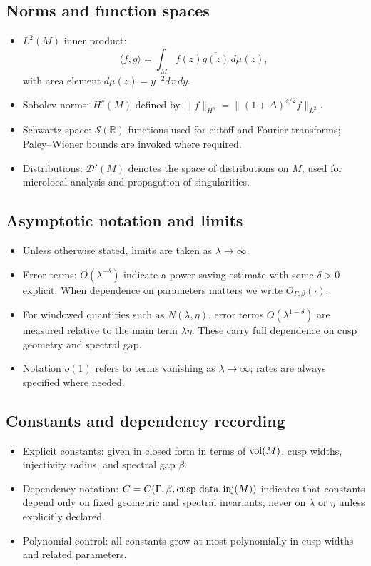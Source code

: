 \subsection*{Norms and function spaces}
\begin{itemize}
  \item $L^2(M)$ inner product: 
    \[
      \langle f,g\rangle=\int_M f(z)\overline{g(z)}\,d\mu(z),
    \]
    with area element $d\mu(z)=y^{-2}dx\,dy$.
  \item Sobolev norms: $H^s(M)$ defined by 
    $\|f\|_{H^s}=\|(1+\Delta)^{s/2}f\|_{L^2}$.
  \item Schwartz space: $\mathcal{S}(\mathbb{R})$ functions used for cutoff and Fourier transforms; 
    Paley–Wiener bounds are invoked where required.
  \item Distributions: $\mathcal{D}'(M)$ denotes the space of distributions on $M$, 
    used for microlocal analysis and propagation of singularities.
\end{itemize}

\subsection*{Asymptotic notation and limits}
\begin{itemize}
  \item Unless otherwise stated, limits are taken as $\lambda\to\infty$.
  \item Error terms: $O(\lambda^{-\delta})$ indicate a power-saving estimate 
    with some $\delta>0$ explicit. 
    When dependence on parameters matters we write $O_{\Gamma,\beta}(\cdot)$.
  \item For windowed quantities such as $N(\lambda,\eta)$, 
    error terms $O(\lambda^{1-\delta})$ are measured relative to the main term $\lambda \eta$. 
    These carry full dependence on cusp geometry and spectral gap.
  \item Notation $o(1)$ refers to terms vanishing as $\lambda\to\infty$; 
    rates are always specified where needed.
\end{itemize}

\subsection*{Constants and dependency recording}
\begin{itemize}
  \item Explicit constants: 
    given in closed form in terms of $\operatorname{vol}(M)$, cusp widths, injectivity radius, and spectral gap $\beta$.
  \item Dependency notation: $C=C(\Gamma,\beta,\text{cusp data},\operatorname{inj}(M))$ 
    indicates that constants depend only on fixed geometric and spectral invariants, 
    never on $\lambda$ or $\eta$ unless explicitly declared.
  \item Polynomial control: all constants grow at most polynomially in cusp widths and related parameters.
\end{itemize}


